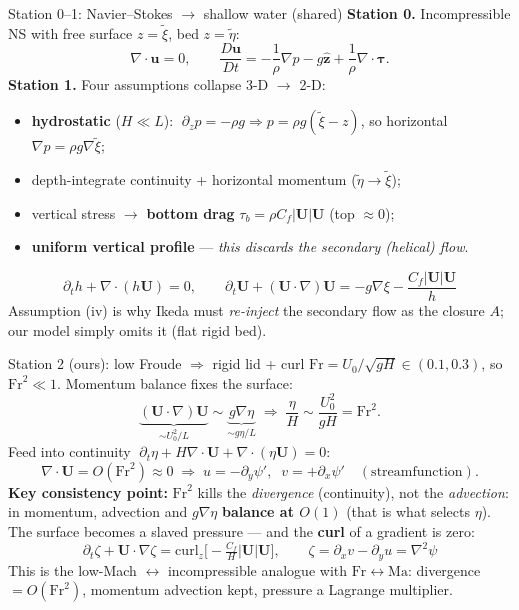\documentclass[aspectratio=169,10pt]{beamer}
\newcommand{\hl}[2]{\textcolor{#1}{\textbf{#2}}}
\newcommand{\pp}{\psi'}
\newcommand{\dt}{\partial_t}
\newcommand{\dx}{\partial_x}
\newcommand{\dy}{\partial_y}
\newcommand{\Fr}{\mathrm{Fr}}
\begin{document}
\begin{frame}{Station 0--1: Navier--Stokes $\to$ shallow water (shared)}
\textbf{Station 0.} Incompressible NS with free surface $z=\tilde\xi$, bed $z=\tilde\eta$:
\[
\nabla\cdot\mathbf u=0,\qquad
\frac{D\mathbf u}{Dt}=-\frac1\rho\nabla p-g\hat{\mathbf z}+\frac1\rho\nabla\cdot\boldsymbol\tau .
\]
\textbf{Station 1.} Four assumptions collapse 3-D $\to$ 2-D:
\begin{itemize}\footnotesize
  \item[(i)] \hl{cChannel}{hydrostatic} ($H\ll L$): $\;\partial_z p=-\rho g\Rightarrow p=\rho g(\tilde\xi-z)$,\; so horizontal $\nabla p=\rho g\nabla\tilde\xi$;
  \item[(ii)] depth-integrate continuity + horizontal momentum ($\tilde\eta\to\tilde\xi$);
  \item[(iii)] vertical stress $\to$ \hl{cBank}{bottom drag} $\tau_b=\rho C_f|\mathbf U|\mathbf U$ (top $\approx0$);
  \item[(iv)] \hl{cEros}{uniform vertical profile} --- \emph{this discards the secondary (helical) flow}.
\end{itemize}
\[
\boxed{\;\dt h+\nabla\cdot(h\mathbf U)=0,\qquad
\dt\mathbf U+(\mathbf U\cdot\nabla)\mathbf U=-g\nabla\xi-\frac{C_f|\mathbf U|\mathbf U}{h}\;}
\]
\footnotesize Assumption (iv) is why Ikeda must \emph{re-inject} the secondary flow as the closure $A$; our model simply omits it (flat rigid bed).
\end{frame}

\begin{frame}{Station 2 (ours): low Froude $\Rightarrow$ rigid lid + curl}
$\Fr=U_0/\sqrt{gH}\in(0.1,0.3)$, so $\Fr^2\ll1$. Momentum balance fixes the surface:
\[
\underbrace{(\mathbf U\!\cdot\!\nabla)\mathbf U}_{\sim U_0^2/L}\sim
\underbrace{g\nabla\eta}_{\sim g\eta/L}\;\Rightarrow\;
\frac{\eta}{H}\sim\frac{U_0^2}{gH}=\Fr^2 .
\]
Feed into continuity $\;\dt\eta+H\nabla\!\cdot\mathbf U+\nabla\!\cdot(\eta\mathbf U)=0$:
\[
\boxed{\nabla\cdot\mathbf U=O(\Fr^2)\approx0}\;\Rightarrow\;
u=-\dy\pp,\;\; v=+\dx\pp\quad(\text{streamfunction}).
\]
\hl{cEros}{Key consistency point:} $\Fr^2$ kills the \emph{divergence} (continuity), not the
\emph{advection}: in momentum, advection and $g\nabla\eta$ \hl{cChannel}{balance at $O(1)$}
(that is what selects $\eta$). The surface becomes a slaved pressure --- and the
\hl{cCurv}{curl} of a gradient is zero:
\[
\boxed{\;\dt\zeta+\mathbf U\cdot\nabla\zeta=\mathrm{curl}_z\!\Big[\!-\tfrac{C_f}{H}|\mathbf U|\mathbf U\Big],
\qquad \zeta=\dx v-\dy u=\nabla^2\psi\;}
\]
\footnotesize This is the low-Mach $\leftrightarrow$ incompressible analogue with $\Fr\!\leftrightarrow\!\mathrm{Ma}$: divergence $=O(\Fr^2)$, momentum advection kept, pressure a Lagrange multiplier.
\end{frame}
\end{document}
